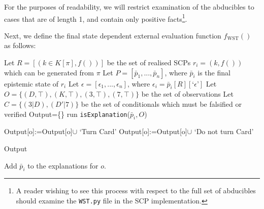 For the purposes of readability, we will restrict examination of the abducibles to cases that are of length 1, and contain only positive facts\footnote{A reader wishing to see this process with respect to the full set of abducibles should examine the \texttt{WST.py} file in the SCP implementation.}.

Next, we define the final state dependent external evaluation function $f_\text{WST}()$ as follows:

\begin{algorithm}[H]
\SetAlgoLined
{}
{
Let $R=[(k \in K[\pi],f())]$ be the set of realised SCPs $r_i=(k,f())$ which can be generated from $\pi$\;
Let $P=[\bar{p}_1,...,\bar{p}_n]$, where $\bar{p}_i$ is the final epistemic state of $r_i$\;
Let $\epsilon=[\epsilon_1,...,\epsilon_n]$, where $\epsilon_i=\bar{p}_i[R][\text{`}\epsilon\text{'}]$\;
Let $O=\{(D,\top),(K,\top),(3,\top),(7,\top)\}$ be the set of observations\;
Let $C=\{(3|D), (D' | 7)\}$ be the set of conditionals which must be falsified or verified\;
Output=\{\}\;
{
run \texttt{isExplanation}($\bar{p}_i,O$)\;
}

{
{
Output[o]:=Output[o]$\cup$ `Turn Card'\;
}
\Else
{
Output[o]:=Output[o]$\cup$ `Do not turn Card'\;
}
}

\Return Output
}
{
{
{
Add $\bar{p}_i$ to the explanations for $o$.
}
}
}

\caption{$\texttt{f}_\text{WST}$}
 \label{f:wst}
\end{algorithm}

\begin{sidewaysfigure}

\caption{Realised SCPs for the SCP interpretation of the WST where $\mu_{D,3}=(\pi,f_\text{WST})$, and $\mu_D=(\pi,f_\text{WST}^\text{pref})$, with $\pi=(s_i \longmapsto \texttt{addAB} \longmapsto \texttt{addExp}  \longmapsto \texttt{wc} \longmapsto \texttt{semantic})$. Results for $\mu_\{D,3\}$ mimic those observed in \cite{holldobler2015weak}'s WST interpretation which concludes the canonical case $D,3$. Results for $\mu_{D}$ conclude the canonical case $D$. }
\label{fig:rSCP_WST}
\end{sidewaysfigure}

